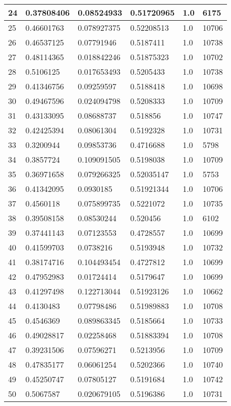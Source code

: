 \begin{longtable}{|l|l|l|l|l|l|}
24 & 0.37808406 & 0.08524933 & 0.51720965 & 1.0 & 6175 \\ \hline 
25 & 0.46601763 & 0.078927375 & 0.52208513 & 1.0 & 10706 \\ \hline 
26 & 0.46537125 & 0.07791946 & 0.5187411 & 1.0 & 10738 \\ \hline 
27 & 0.48114365 & 0.018842246 & 0.51875323 & 1.0 & 10702 \\ \hline 
28 & 0.5106125 & 0.017653493 & 0.5205433 & 1.0 & 10738 \\ \hline 
29 & 0.41346756 & 0.09259597 & 0.5188418 & 1.0 & 10698 \\ \hline 
30 & 0.49467596 & 0.024094798 & 0.5208333 & 1.0 & 10709 \\ \hline 
31 & 0.43133095 & 0.08688737 & 0.518856 & 1.0 & 10747 \\ \hline 
32 & 0.42425394 & 0.08061304 & 0.5192328 & 1.0 & 10731 \\ \hline 
33 & 0.3200944 & 0.09853736 & 0.4716688 & 1.0 & 5798 \\ \hline 
34 & 0.3857724 & 0.109091505 & 0.5198038 & 1.0 & 10709 \\ \hline 
35 & 0.36971658 & 0.079266325 & 0.52035147 & 1.0 & 5753 \\ \hline 
36 & 0.41342095 & 0.0930185 & 0.51921344 & 1.0 & 10706 \\ \hline 
37 & 0.4560118 & 0.075899735 & 0.5221072 & 1.0 & 10735 \\ \hline 
38 & 0.39508158 & 0.08530244 & 0.520456 & 1.0 & 6102 \\ \hline 
39 & 0.37441143 & 0.07123553 & 0.4728557 & 1.0 & 10699 \\ \hline 
40 & 0.41599703 & 0.0738216 & 0.5193948 & 1.0 & 10732 \\ \hline 
41 & 0.38174716 & 0.104493454 & 0.4727812 & 1.0 & 10699 \\ \hline 
42 & 0.47952983 & 0.01724414 & 0.5179647 & 1.0 & 10699 \\ \hline 
43 & 0.41297498 & 0.122713044 & 0.51923126 & 1.0 & 10662 \\ \hline 
44 & 0.4130483 & 0.07798486 & 0.51989883 & 1.0 & 10708 \\ \hline 
45 & 0.4546369 & 0.089863345 & 0.5185664 & 1.0 & 10733 \\ \hline 
46 & 0.49028817 & 0.02258468 & 0.51883394 & 1.0 & 10708 \\ \hline 
47 & 0.39231506 & 0.07596271 & 0.5213956 & 1.0 & 10709 \\ \hline 
48 & 0.47835177 & 0.06061254 & 0.5202366 & 1.0 & 10740 \\ \hline 
49 & 0.45250747 & 0.07805127 & 0.5191684 & 1.0 & 10742 \\ \hline 
50 & 0.5067587 & 0.020679105 & 0.5196386 & 1.0 & 10731 \\ \hline 
\end{longtable}